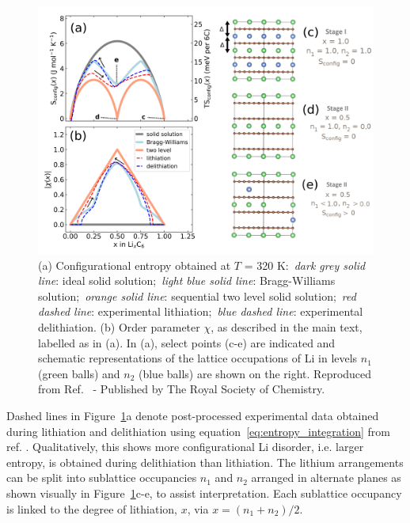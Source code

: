 \documentclass[../main.tex]{subfiles}
\begin{document}
\begin{figure}
    \centering
    \includegraphics[scale=0.36]{figures/order_parameter_scheme_v2.jpg}
    \caption{(a) Configurational entropy obtained at $T$ = 320 K:~\emph{dark grey solid line}: ideal solid solution;~\emph{light blue solid line}: Bragg-Williams solution;~\emph{orange solid line}: sequential two level solid solution;~\emph{red dashed line}: experimental lithiation;~\emph{blue dashed line}: experimental delithiation. (b) Order parameter \textbar{}\(\chi\)\textbar{}, as described in the main text, labelled as in (a). In (a), select points (c-e) are indicated and schematic representations of the lattice occupations of Li in levels $n_{1}$ (green balls) and $n_{2}$ (blue balls) are shown on the right. Reproduced from Ref.~ - Published by The Royal Society of Chemistry.}
    \label{fig:entropy_scheme}
\end{figure}

Dashed lines in Figure~\ref{fig:entropy_scheme}a denote post-processed experimental data obtained during lithiation and delithiation using equation~\ref{eq:entropy_integration} from ref. . Qualitatively, this shows more configurational Li disorder, i.e. larger entropy, is obtained during delithiation than lithiation. The lithium arrangements can be split into sublattice occupancies $n_{1}$ and $n_{2}$ arranged in alternate planes as shown visually in Figure~\ref{fig:entropy_scheme}c-e, to assist interpretation. Each sublattice occupancy is linked to the degree of lithiation, $x$, via $x = (n_{1} + n_{2})/2$.
\end{document}
